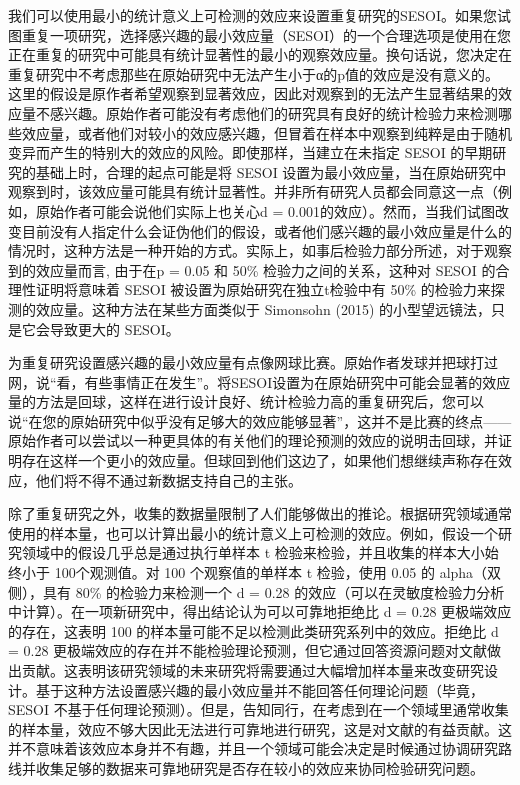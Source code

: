 \documentclass[
  letterpaper,
  DIV=11,
  numbers=noendperiod]{scrreprt}
\begin{document}
我们可以使用最小的统计意义上可检测的效应来设置重复研究的SESOI。如果您试图重复一项研究，选择感兴趣的最小效应量（SESOI）的一个合理选项是使用在您正在重复的研究中可能具有统计显著性的最小的观察效应量。换句话说，您决定在重复研究中不考虑那些在原始研究中无法产生小于α的p值的效应是没有意义的。这里的假设是原作者希望观察到显著效应，因此对观察到的无法产生显著结果的效应量不感兴趣。原始作者可能没有考虑他们的研究具有良好的统计检验力来检测哪些效应量，或者他们对较小的效应感兴趣，但冒着在样本中观察到纯粹是由于随机变异而产生的特别大的效应的风险。即使那样，当建立在未指定
SESOI 的早期研究的基础上时，合理的起点可能是将 SESOI
设置为最小效应量，当在原始研究中观察到时，该效应量可能具有统计显著性。并非所有研究人员都会同意这一点（例如，原始作者可能会说他们实际上也关心d
=
0.001的效应）。然而，当我们试图改变目前没有人指定什么会证伪他们的假设，或者他们感兴趣的最小效应量是什么的情况时，这种方法是一种开始的方式。实际上，如事后检验力部分所述，对于观察到的效应量而言,
由于在p = 0.05 和 50\% 检验力之间的关系，这种对 SESOI
的合理性证明将意味着 SESOI 被设置为原始研究在独立t检验中有 50\%
的检验力来探测的效应量。这种方法在某些方面类似于 Simonsohn (2015)
的小型望远镜法，只是它会导致更大的 SESOI。

为重复研究设置感兴趣的最小效应量有点像网球比赛。原始作者发球并把球打过网，说``看，有些事情正在发生''。将SESOI设置为在原始研究中可能会显著的效应量的方法是回球，这样在进行设计良好、统计检验力高的重复研究后，您可以说``在您的原始研究中似乎没有足够大的效应能够显著''，这并不是比赛的终点------原始作者可以尝试以一种更具体的有关他们的理论预测的效应的说明击回球，并证明存在这样一个更小的效应量。但球回到他们这边了，如果他们想继续声称存在效应，他们将不得不通过新数据支持自己的主张。

除了重复研究之外，收集的数据量限制了人们能够做出的推论。根据研究领域通常使用的样本量，也可以计算出最小的统计意义上可检测的效应。例如，假设一个研究领域中的假设几乎总是通过执行单样本
t 检验来检验，并且收集的样本大小始终小于 100个观测值。对 100
个观察值的单样本 t 检验，使用 0.05 的 alpha（双侧），具有 80\%
的检验力来检测一个 d = 0.28
的效应（可以在灵敏度检验力分析中计算）。在一项新研究中，得出结论认为可以可靠地拒绝比
d = 0.28 更极端效应的存在，这表明 100
的样本量可能不足以检测此类研究系列中的效应。拒绝比 d = 0.28
更极端效应的存在并不能检验理论预测，但它通过回答资源问题对文献做出贡献。这表明该研究领域的未来研究将需要通过大幅增加样本量来改变研究设计。基于这种方法设置感兴趣的最小效应量并不能回答任何理论问题（毕竟，SESOI
不基于任何理论预测）。但是，告知同行，在考虑到在一个领域里通常收集的样本量，效应不够大因此无法进行可靠地进行研究，这是对文献的有益贡献。这并不意味着该效应本身并不有趣，并且一个领域可能会决定是时候通过协调研究路线并收集足够的数据来可靠地研究是否存在较小的效应来协同检验研究问题。
\end{document}
